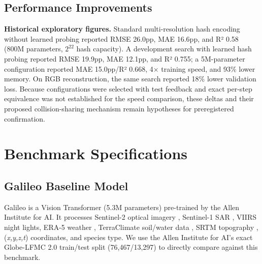 \documentclass{article} %
\begin{document}
\subsection{Performance Improvements}
\label{appendix:baseline_results}

\textbf{Historical exploratory figures.} Standard multi-resolution hash encoding without learned probing reported RMSE 26.0pp, MAE 16.6pp, and R² 0.58 (800M parameters, $2^{22}$ hash capacity). A development search with learned hash probing \citep{takikawa2023compactneuralgraphicsprimitives} reported RMSE 19.9pp, MAE 12.1pp, and R² 0.755; a 5M-parameter configuration reported MAE 15.0pp/R² 0.668, 4$\times$ training speed, and 93\% lower memory. On RGB reconstruction, the same search reported 18\% lower validation loss. Because configurations were selected with test feedback and exact per-step equivalence was not established for the speed comparison, these deltas and their proposed collision-sharing mechanism remain hypotheses for preregistered confirmation.

\newpage

\section{Benchmark Specifications}
\label{appendix:benchmark}

\subsection{Galileo Baseline Model}

Galileo \citep{johnson2025highresolutionlivefuelmoisture,tsenggalileo} is a Vision Transformer \citep{dosovitskiy2021an} (5.3M parameters) pre-trained by the Allen Institute for AI. It processes Sentinel-2 optical imagery \citep{drusch2012sentinel}, Sentinel-1 SAR \citep{torres2012gmes}, VIIRS night lights, ERA-5 weather \citep{munozsabater2019era5}, TerraClimate soil/water data \citep{abatzoglou2018terraclimate}, SRTM topography \citep{farr2000shuttle}, (\textit{x,y,z,t}) coordinates, and species type. We use the Allen Institute for AI's exact Globe-LFMC 2.0 \citep{yebra2024globe} train/test split (76,467/13,297) to directly compare against this benchmark.
\end{document}
